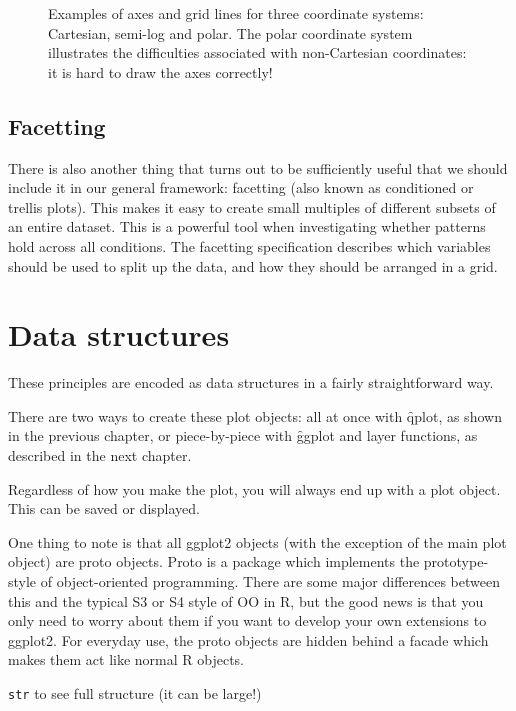 \begin{figure}[htbp]
  \centering
  \caption{Examples of axes and grid lines for three coordinate systems: Cartesian, semi-log and polar. The polar coordinate system illustrates the difficulties associated with non-Cartesian coordinates: it is hard to draw the axes correctly!}
  \label{fig:coord}
\end{figure}

\subsection{Facetting}\label{sec:intro-facetting}

There is also another thing that turns out to be sufficiently useful that we should include it in our general framework: facetting (also known as conditioned or trellis plots). This makes it easy to create small multiples of different subsets of an entire dataset. This is a powerful tool when investigating whether patterns hold across all conditions.  The facetting specification describes which variables should be used to split up the data, and how they should be arranged in a grid.

\section{Data structures}
\label{sec:data-structures}

These principles are encoded as data structures in a fairly straightforward way.

There are two ways to create these plot objects: all at once with \f{qplot}, as shown in the previous chapter, or piece-by-piece with \f{ggplot} and layer functions, as described in the next chapter.

Regardless of how you make the plot, you will always end up with a plot object.  This can be saved or displayed.

One thing to note is that all ggplot2 objects (with the exception of the main plot object) are proto objects.  Proto is a package which implements the prototype-style of object-oriented programming.  There are some major differences between this and the typical S3 or S4 style of OO in R, but the good news is that you only need to worry about them if you want to develop your own extensions to ggplot2.  For everyday use, the proto objects are hidden behind a facade which makes them act like normal R objects.

{\tt str} to see full structure (it can be large!)


